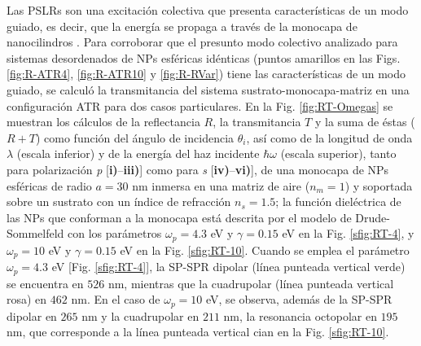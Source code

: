 Las PSLRs son una excitación colectiva que presenta características de un modo guiado, es decir, que la energía se propaga a través de la monocapa de nanocilindros \cite{kabashin2009plasmonic}. Para corroborar que el presunto modo colectivo analizado para sistemas desordenados de NPs esféricas idénticas (puntos amarillos en las Figs. \ref{fig:R-ATR4}, \ref{fig:R-ATR10} y \ref{fig:R-RVar}) tiene las características de un modo guiado, se calculó la transmitancia del sistema sustrato-monocapa-matriz en una configuración ATR para dos casos particulares. En la Fig. \ref{fig:RT-Omegas} se muestran los cálculos de la reflectancia $R$, la transmitancia $T$ y la suma de éstas ($R+T$) como función del ángulo de incidencia $\theta_i$, así como de la longitud de onda $\lambda$ (escala inferior) y de la energía del haz incidente $\hbar\omega$ (escala superior), tanto para polarización \emph{p}  [\textbf{i)}--\textbf{iii)}] como para \emph{s} [\textbf{iv)}--\textbf{vi)}], de una monocapa de NPs esféricas de radio $a = 30$ nm inmersa en una matriz de aire ($n_m = 1$) y soportada sobre un sustrato con un índice de refracción $n_s = 1.5$; la función dieléctrica de las NPs que conforman a la monocapa está descrita por el modelo de Drude-Sommelfeld con los parámetros $\omega_p = 4.3$ eV y $\gamma = 0.15$ eV en la Fig. \ref{sfig:RT-4}, y $\omega_p = 10$ eV y $\gamma=0.15$ eV en la Fig. \ref{sfig:RT-10}. Cuando se emplea el parámetro $\omega_p = 4.3$ eV [Fig. \ref{sfig:RT-4}], la SP-SPR dipolar  (línea punteada vertical verde) se encuentra en $526$ nm, mientras que la cuadrupolar (línea punteada vertical rosa)  en $462$ nm. En el caso de $\omega_p=10$ eV, se observa, además de  la SP-SPR dipolar en $265$ nm y la cuadrupolar en $211$ nm, la resonancia octopolar en $195$ nm, que corresponde a la línea punteada vertical cian en la Fig. \ref{sfig:RT-10}.


